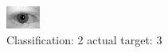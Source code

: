\begin{figure}[h!]
\begin{center}
\includegraphics[width=0.60\columnwidth]{figures/ID683_class_2_target_3.png}
\end{center}
\caption{ Classification: 2 actual target: 3}
\label{fig:ID683_class_2_target_3}
\end{figure}
